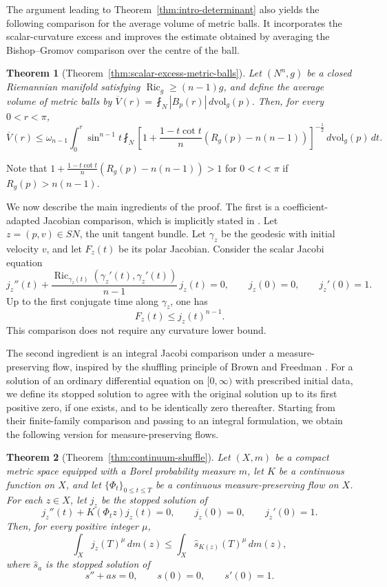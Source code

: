 \documentclass[11pt, reqno]{amsart}
\newtheorem{theorem}{Theorem}
\begin{document}
The argument leading to Theorem~\ref{thm:intro-determinant} also yields the following comparison for the average volume of metric balls. It incorporates the scalar-curvature excess and improves the estimate obtained by averaging the Bishop--Gromov comparison over the centre of the ball.

\begin{theorem}[Theorem~\ref{thm:scalar-excess-metric-balls}]
\label{thm:intro-average-balls}
Let $(N^n, g)$ be a closed Riemannian manifold satisfying $\operatorname{Ric}_g\ge (n-1)g$, and define the average volume of metric balls by
$\overline V(r)=\fint_N |B_p(r)|\, d\mathrm{vol}_g(p)$.
Then, for every $0<r<\pi$,
$$
\overline V(r)
\le
\omega_{n-1}
\int_0^r
\sin^{n-1}t
\fint_N
\left[
1+\frac{1-t\cot t}{n}
\left(R_g(p)-n(n-1)\right)
\right]^{-\frac12}
\, d\mathrm{vol}_g(p)\, dt.
$$
\end{theorem}

Note that $1+\frac{1-t\cot t}{n}\left(R_g(p)-n(n-1)\right)>1$ for $0<t<\pi$ if $R_g(p)>n(n-1)$.

We now describe the main ingredients of the proof. The first is a coefficient-adapted Jacobian comparison, which is implicitly stated in \cite{BrownFreedman2022}. Let $z=(p, v)\in SN$, the unit tangent bundle. Let $\gamma_z$ be the geodesic with initial velocity $v$, and let $F_z(t)$ be its polar Jacobian. Consider the scalar Jacobi equation
$$
j_z''(t) + \frac{\operatorname{Ric}_{\gamma_z(t)} (\gamma_z'(t), \gamma_z'(t))}{n-1}\, j_z(t) =0,
\qquad
j_z(0)=0,
\qquad
j_z'(0)=1.
$$
Up to the first conjugate time along $\gamma_z$, one has
\begin{equation}\label{eq:intro-jacobian-comparison}
F_z(t)\le j_z(t)^{n-1}.
\end{equation}
This comparison does not require any curvature lower bound.

The second ingredient is an integral Jacobi comparison under a measure-preserving flow, inspired by the shuffling principle of Brown and Freedman \cite{BrownFreedman2022}. For a solution of an ordinary differential equation on $[0, \infty)$ with prescribed initial data, we define its stopped solution to agree with the original solution up to its first positive zero, if one exists, and to be identically zero thereafter. Starting from their finite-family comparison and passing to an integral formulation, we obtain the following version for measure-preserving flows.

\begin{theorem}[Theorem~\ref{thm:continuum-shuffle}]
\label{thm:intro-integral-jacobi}
Let $(X, m)$ be a compact metric space equipped with a Borel probability measure $m$, let $K$ be a continuous function on $X$, and let $\{\Phi_t\}_{0\le t\le T}$ be a continuous measure-preserving flow on $X$. For each $z\in X$, let $j_z$ be the stopped solution of
$$
j_z''(t)+K(\Phi_tz)j_z(t)=0,
\qquad
j_z(0)=0,
\qquad
j_z'(0)=1.
$$
Then, for every positive integer $\mu$,
$$
\int_X j_z(T)^\mu\, dm(z)
\le
\int_X\widehat{s}_{K(z)}(T)^\mu\, dm(z),
$$
where $\widehat{s}_a$ is the stopped solution of
$$
s''+as=0,
\qquad
s(0)=0,
\qquad
s'(0)=1.
$$
\end{theorem}
\end{document}
